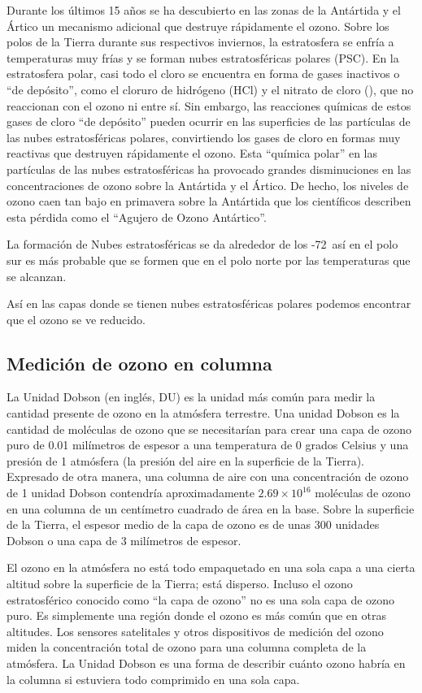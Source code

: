 Durante los últimos 15 años se ha descubierto en las zonas de la Antártida y el Ártico un mecanismo adicional que destruye rápidamente el ozono. Sobre los polos de la Tierra durante sus respectivos inviernos, la estratosfera se enfría a temperaturas muy frías y se forman nubes estratosféricas polares (PSC). En la estratosfera polar, casi todo el cloro se encuentra en forma de gases inactivos o ``de depósito'', como el cloruro de hidrógeno (HCl) y el nitrato de cloro (), que no reaccionan con el ozono ni entre sí. Sin embargo, las reacciones químicas de estos gases de cloro ``de depósito''  pueden ocurrir en las superficies de las partículas de las nubes estratosféricas polares, convirtiendo los gases de cloro en formas muy reactivas que destruyen rápidamente el ozono. Esta ``química polar'' en las partículas de las nubes estratosféricas ha provocado grandes disminuciones en las concentraciones de ozono sobre la Antártida y el Ártico. De hecho, los niveles de ozono caen tan bajo en primavera sobre la Antártida que los científicos describen esta pérdida como el ``Agujero de Ozono Antártico''.

La formación de Nubes estratosféricas se da alrededor de los -72\celsius\, así en el polo sur es más probable que se formen que en el polo norte por las temperaturas que se alcanzan.

Así en las capas donde se tienen nubes estratosféricas polares podemos encontrar que el ozono se ve reducido.

\subsection{Medición de ozono en columna}
La Unidad Dobson (en inglés, DU) es la unidad más común para medir la cantidad presente de ozono en la atmósfera terrestre. Una unidad Dobson es la cantidad de moléculas de ozono que se necesitarían para crear una capa de ozono puro de 0.01 milímetros de espesor a una temperatura de 0 grados Celsius y una presión de 1 atmósfera (la presión del aire en la superficie de la Tierra). Expresado de otra manera, una columna de aire con una concentración de ozono de 1 unidad Dobson contendría aproximadamente $2.69\times10^{16}$ moléculas de ozono en una columna de un centímetro cuadrado de área en la base. Sobre la superficie de la Tierra, el espesor medio de la capa de ozono es de unas 300 unidades Dobson o una capa de 3 milímetros de espesor.

El ozono en la atmósfera no está todo empaquetado en una sola capa a una cierta altitud sobre la superficie de la Tierra; está disperso. Incluso el ozono estratosférico conocido como ``la capa de ozono'' no es una sola capa de ozono puro. Es simplemente una región donde el ozono es más común que en otras altitudes. Los sensores satelitales y otros dispositivos de medición del ozono miden la concentración total de ozono para una columna completa de la atmósfera. La Unidad Dobson es una forma de describir cuánto ozono habría en la columna si estuviera todo comprimido en una sola capa.

